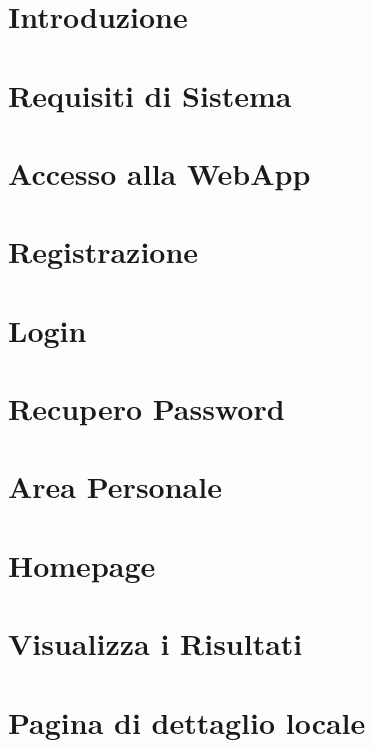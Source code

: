 \documentclass[a4paper]{article}
\begin{document}
			
		\renewcommand{\contentsname}{Indice}
		\tableofcontents	
		\listoffigures
		\pagebreak

				

		\section{Introduzione}
		
		\newpage
		
		\section{Requisiti di Sistema}
		
		
		\section{Accesso alla WebApp}
		

		\section{Registrazione}
		
		
		\section{Login}
		
		
		\section{Recupero Password}
		
		
		\section{Area Personale}
		

		\section{Homepage}
		
		
		\section{Visualizza i Risultati}
				
		
		\section{Pagina di dettaglio locale}
		
		
\end{document}
